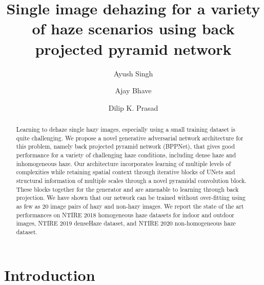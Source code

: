 \documentclass[runningheads]{llncs}
\begin{document}
\pagestyle{headings}
\mainmatter
\def\ECCVSubNumber{36}  



\title{Single image dehazing for a variety of haze scenarios using back projected pyramid network}

\begin{comment}
\titlerunning{ECCV-20 submission ID \ECCVSubNumber} 
\authorrunning{ECCV-20 submission ID \ECCVSubNumber} 
\author{Anonymous ECCV submission}
\institute{Paper ID \ECCVSubNumber}
\end{comment}


\author{{Ayush Singh} \and
Ajay Bhave \and
Dilip K. Prasad}
\maketitle

\begin{abstract}
Learning to dehaze single hazy images, especially using a small training dataset is quite challenging. We propose a novel generative adversarial network architecture for this problem, namely back projected pyramid network (BPPNet), that gives good performance for a variety of challenging haze conditions, including dense haze and inhomogeneous haze. Our architecture incorporates learning of multiple levels of complexities while retaining spatial context through iterative blocks of UNets and structural information of multiple scales through a novel pyramidal convolution block. These blocks together for the generator and are amenable to learning through back projection. We have shown that our network can be trained without over-fitting using as few as 20 image pairs of hazy and non-hazy images. We report the state of the art performances on NTIRE 2018 homogeneous haze datasets for indoor and outdoor images, NTIRE 2019 denseHaze dataset, and NTIRE 2020 non-homogeneous haze dataset.


\end{abstract}

\section{Introduction}
\end{document}
